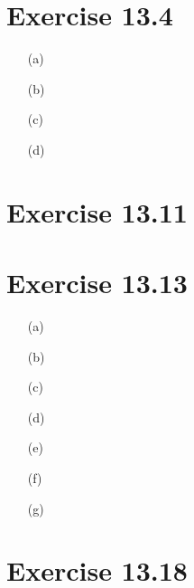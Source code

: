 \documentclass{article}
\begin{document}

\section*{Exercise 13.4}

\begin{itemize}
	\item[(a)]
	
	\item[(b)]
	
	\item[(c)]
	
	\item[(d)]
	
\end{itemize}


\section*{Exercise 13.11}


\section*{Exercise 13.13}

\begin{itemize}
	\item[(a)]
	
	
	\item[(b)]
	
	
	\item[(c)]
	
	
	\item[(d)]
	
	
	\item[(e)]
	
	
	\item[(f)]
	
	
	\item[(g)]
	
	
\end{itemize}


\section*{Exercise 13.18}
\end{document}
